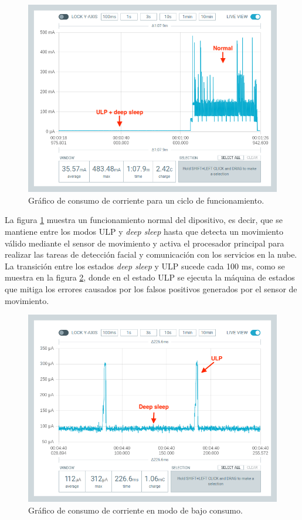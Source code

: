 \begin{figure}[h]
	\centering
	\includegraphics[scale=0.45]{./Figures/test_ulp1.png}
	\caption{Gráfico de consumo de corriente para un ciclo de funcionamiento.}
	\label{fig:test_ulp1}
\end{figure}

La figura \ref{fig:test_ulp1} muestra un funcionamiento normal del dipositivo, es decir, que se mantiene entre los modos ULP y \textit{deep sleep} hasta que detecta un movimiento válido mediante el sensor de movimiento y activa el procesador principal para realizar las tareas de detección facial y comunicación con los servicios en la nube. La transición entre los estados \textit{deep sleep} y ULP sucede cada 100 ms, como se muestra en la figura \ref{fig:test_ulp2}, donde en el estado ULP se ejecuta la máquina de estados que mitiga los errores causados por los falsos positivos generados por el sensor de movimiento.

\clearpage


\begin{figure}[h]
	\centering
	\includegraphics[scale=0.45]{./Figures/test_ulp2.png}
	\caption{Gráfico de consumo de corriente en modo de bajo consumo.}
	\label{fig:test_ulp2}
\end{figure}

